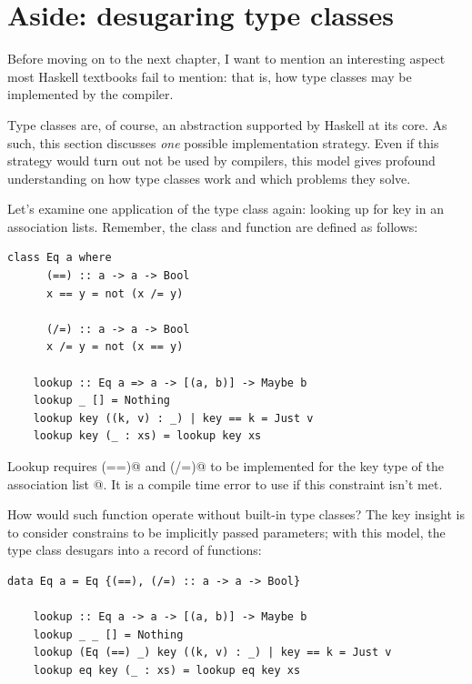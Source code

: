 \documentclass[UdineBachThesis,american,11pt]{PhdThesis}
\begin{document}
  \section{Aside: desugaring type classes}

  Before moving on to the next chapter, I want to mention an interesting aspect
  most Haskell textbooks fail to mention: that is, how type classes may be
  implemented by the compiler.

  Type classes are, of course, an abstraction supported by Haskell at its core.
  As such, this section discusses \emph{one} possible implementation strategy.
  Even if this strategy would turn out not be used by compilers, this model
  gives profound understanding on how type classes work and which problems they
  solve.

  Let's examine one application of the \lstinline@Eq@ type class again: looking
  up for key in an association lists. Remember, the \lstinline@Eq@ class and
  \lstinline@lookup@ function are defined as follows:

  \begin{lstlisting}[gobble=4,basicstyle=\ttfamily\small]
    class Eq a where
      (==) :: a -> a -> Bool
      x == y = not (x /= y)

      (/=) :: a -> a -> Bool
      x /= y = not (x == y)

    lookup :: Eq a => a -> [(a, b)] -> Maybe b
    lookup _ [] = Nothing
    lookup key ((k, v) : _) | key == k = Just v
    lookup key (_ : xs) = lookup key xs
  \end{lstlisting}

  Lookup requires \lstinline@(==)@ and \lstinline@(/=)@ to be implemented for
  the key type \lstinline@a@ of the association list \lstinline@[(a, b)]@. It is
  a compile time error to use \lstinline@lookup@ if this constraint isn't met.

  How would such function operate without built-in type classes? The key insight
  is to consider constrains to be implicitly passed parameters; with this model,
  the \lstinline@Eq@ type class desugars into a record of functions:

  \begin{lstlisting}[gobble=4,basicstyle=\ttfamily\small]
    data Eq a = Eq {(==), (/=) :: a -> a -> Bool}

    lookup :: Eq a -> a -> [(a, b)] -> Maybe b
    lookup _ _ [] = Nothing
    lookup (Eq (==) _) key ((k, v) : _) | key == k = Just v
    lookup eq key (_ : xs) = lookup eq key xs
  \end{lstlisting}
\end{document}
